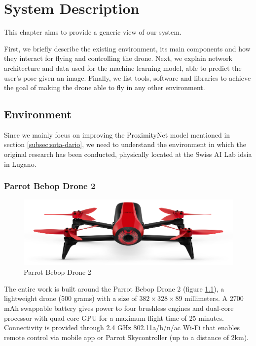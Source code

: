 \chapter{System Description}
\label{chap:system}


This chapter aims to provide a generic view of our system.

First, we briefly describe the existing environment, its main components and how they interact for flying and controlling the drone. Next, we explain network architecture and data used for the machine learning model, able to predict the user's pose given an image. Finally, we list tools, software and libraries to achieve the goal of making the drone able to fly in any other environment. %




\section{Environment}
\label{sec:hardware}

Since we mainly focus on improving the ProximityNet model mentioned in section \ref{subsec:sota-dario}, we need to understand the environment in which the original research has been conducted, physically located at the Swiss AI Lab \gls{idsia} in Lugano.



\subsection{Parrot Bebop Drone 2}
\label{subsec:bebop}

\begin{figure}[!htb]
	\centering
	\includegraphics[width=.8\textwidth]{"contents/images/03-Parrot-Bebop-2"}
	\caption[Parrot Bebop Drone 2]{Parrot Bebop Drone 2}
	\label{fig:bebop}
\end{figure}

The entire work is built around the Parrot Bebop Drone 2 (figure \ref{fig:bebop}), a lightweight drone (500 grams) with a size of $382 \times 328 \times 89$ millimeters. A 2700 mAh swappable battery gives power to four brushless engines and dual-core processor with quad-core GPU for a maximum flight time of 25 minutes. Connectivity is provided through 2.4 GHz 802.11a/b/n/ac Wi-Fi that enables remote control via mobile app or Parrot Skycontroller (up to a distance of 2km).

